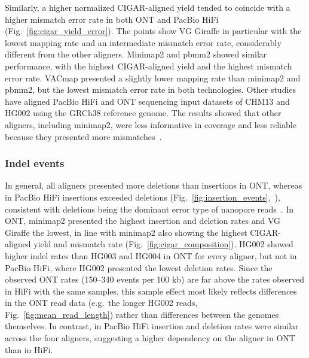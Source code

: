 \documentclass[12pt, letterpaper]{article}
\begin{document}
Similarly, a higher normalized CIGAR-aligned yield tended to coincide with a higher mismatch error rate in both ONT and PacBio HiFi (Fig.~\ref{fig:cigar_yield_error}). The points show VG Giraffe in particular with the lowest mapping rate and an intermediate mismatch error rate, considerably different from the other aligners. Minimap2 and pbmm2 showed similar performance, with the highest CIGAR-aligned yield and the highest mismatch error rate. VACmap presented a slightly lower mapping rate than minimap2 and pbmm2, but the lowest mismatch error rate in both technologies. Other studies have aligned PacBio HiFi and ONT sequencing input datasets of CHM13 and HG002 using the GRCh38 reference genome. The results showed that other aligners, including minimap2, were less informative in coverage and less reliable because they presented more mismatches~\cite{vacmap2025}.

\subsubsection{Indel events}
In general, all aligners presented more deletions than insertions in ONT, whereas in PacBio HiFi insertions exceeded deletions (Fig.~\ref{fig:insertion_events},~), consistent with deletions being the dominant error type of nanopore reads~\cite{Delahaye2021}. In ONT, minimap2 presented the highest insertion and deletion rates and VG Giraffe the lowest, in line with minimap2 also showing the highest CIGAR-aligned yield and mismatch rate (Fig.~\ref{fig:cigar_composition}). HG002 showed higher indel rates than HG003 and HG004 in ONT for every aligner, but not in PacBio HiFi, where HG002 presented the lowest deletion rates. Since the observed ONT rates (150--340 events per 100 kb) are far above the rates observed in HiFi with the same samples, this sample effect most likely reflects differences in the ONT read data (e.g.\ the longer HG002 reads, Fig.~\ref{fig:mean_read_length}) rather than differences between the genomes themselves. In contrast, in PacBio HiFi insertion and deletion rates were similar across the four aligners, suggesting a higher dependency on the aligner in ONT than in HiFi.
\end{document}
